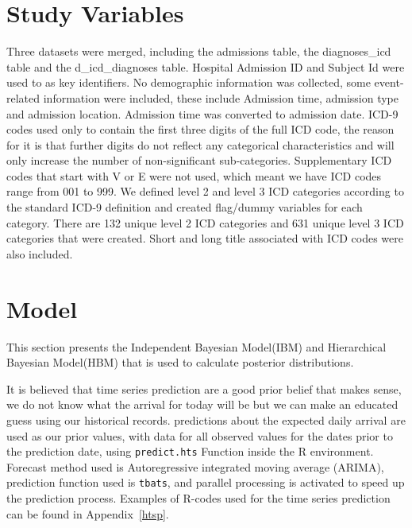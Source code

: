 \section{Study Variables}

Three datasets were merged, including the admissions table, the diagnoses\_icd table and the d\_icd\_diagnoses table. Hospital Admission ID and Subject Id were used to as key identifiers. No demographic information was collected, some event-related information were included, these include Admission time, admission type and admission location. Admission time was converted to admission date. ICD-9 codes used only to contain the first three digits of the full ICD code, the reason for it is that further digits do not reflect any categorical characteristics and will only increase the number of non-significant sub-categories. Supplementary ICD codes that start with V or E were not used, which meant we have ICD codes range from 001 to 999. We defined level 2 and level 3 ICD categories according to the standard ICD-9 definition and created flag/dummy variables for each category. There are 132 unique level 2 ICD categories and 631 unique level 3 ICD categories that were created. Short and long title associated with ICD codes were also included. 

\section{Model}

This section presents the Independent Bayesian Model(IBM) and Hierarchical Bayesian Model(HBM) that is used to calculate posterior distributions. 

\newpara

It is believed that time series prediction are a good prior belief that makes sense, we do not know what the arrival for today will be but we can make an educated guess using our historical records. predictions about the expected daily arrival are used as our prior values, with data for all observed values for the dates prior to the prediction date, using \texttt{predict.hts} Function inside the R environment. Forecast method used is Autoregressive integrated moving average (ARIMA), prediction function used is \texttt{tbats}, and parallel processing is activated to speed up the prediction process. Examples of R-codes used for the time series prediction can be found in Appendix~\ref{htsp}. 

\newpara

